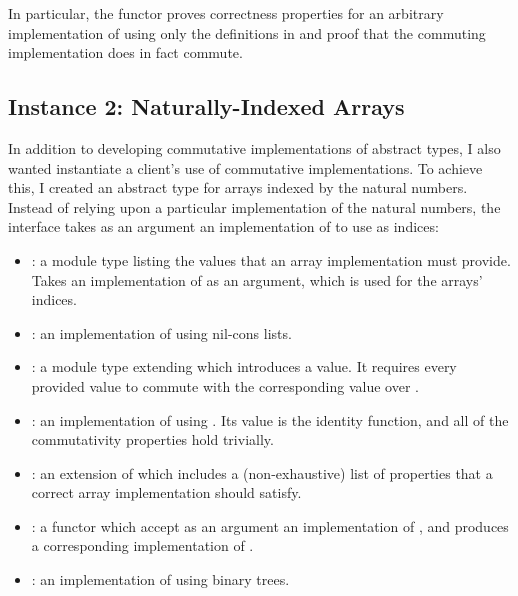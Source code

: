 \documentclass[12pt]{article}
\begin{document}
  \noindent In particular, the  functor proves correctness properties for an arbitrary implementation of  using only the definitions in  and proof that the commuting implementation does in fact commute.

\subsection{Instance 2: Naturally-Indexed Arrays}

  In addition to developing commutative implementations of abstract types, I also wanted instantiate a client's use of commutative implementations. To achieve this, I created an abstract type for arrays indexed by the natural numbers. Instead of relying upon a particular implementation of the natural numbers, the interface takes as an argument an implementation of  to use as indices:

  \begin{itemize}
    \item {}: a module type listing the values that an array implementation must provide. Takes an implementation of  as an argument, which is used for the arrays' indices.
    \item {}: an implementation of  using nil-cons lists.
    \item {}: a module type extending  which introduces a  value. It requires every provided value to commute with the corresponding  value over .
    \item {}: an implementation of  using . Its  value is the identity function, and all of the commutativity properties hold trivially.
    \item {}: an extension of  which includes a (non-exhaustive) list of properties that a correct array implementation should satisfy.
    \item {}: a functor which accept as an argument an implementation of , and produces a corresponding implementation of .
    \item {}: an implementation of  using binary trees.
  \end{itemize}
\end{document}
